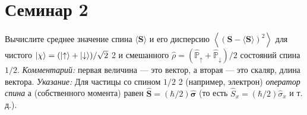 \section{Семинар 2}
\begin{exercise}
	Вычислите среднее значение спина $\langle\boldsymbol{S}\rangle$ и его дисперсию $\left\langle(\boldsymbol{S}-\langle\boldsymbol{S}\rangle)^{2}\right\rangle$ для чистого $\ket{\chi}= (\ket{\uparrow}+\ket{\downarrow}) / \sqrt{2}$ 2 и смешанного $\hat{\rho}=\left(\hat{\mathbb{P}}_{\uparrow}+\hat{\mathbb{P}}_{\downarrow}\right) / 2$  состояний спина $1/ 2$. \textit{Комментарий:}  первая величина — это вектор, а вторая
	— это скаляр, длина вектора. \textit{Указание:} Для частицы со спином $1 / 2$ 2 (например, электрон) \textit{оператор спина} а (собственного
	момента)  равен $\hat{\boldsymbol{S}}=(\hbar / 2) \hat{\boldsymbol{\sigma}}$ (то есть $\hat{S}_{x}=(\hbar / 2) \hat{\sigma}_{x}$ и т. д.).
	
\end{exercise}	

